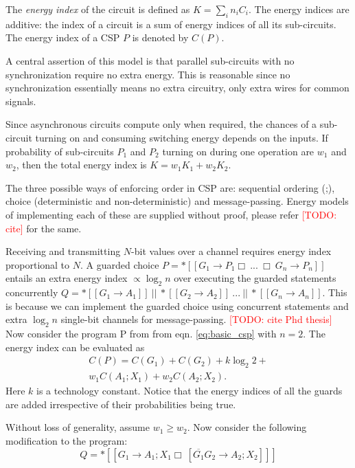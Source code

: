 The \emph{energy index} of the circuit is defined as $K = \sum_i n_i C_i$.
The energy indices are additive: the index of a circuit is a sum of energy indices
of all its sub-circuits. The energy index of a CSP $P$ is denoted by $C(P)$.

A central assertion of this model is that parallel sub-circuits with no
synchronization require no extra energy. 
This is reasonable since no synchronization essentially means no
extra circuitry, only extra wires for common signals. 

Since asynchronous circuits compute only when required, the chances of a sub-circuit 
turning on and consuming switching energy depends on the inputs. If probability
of sub-circuits $P_1$ and $P_2$ turning on during one operation are $w_1$
and $w_2$, then the total energy index is $K = w_1 K_1 + w_2 K_2$.

The three possible ways of enforcing order in CSP are: sequential ordering
(;), choice (deterministic and non-deterministic) and message-passing. Energy 
models of implementing each of these are supplied without proof, please refer 
\textcolor{red}{[TODO: cite]} for the same.

Receiving and transmitting $N$-bit values over a channel requires energy
index proportional to $N$. 
A guarded choice $P = *[[G_1 \to P_1 \Box\ ...\ \Box\ G_n \to P_n]]$
entails an extra energy index $\propto \log_2 {n}$ over executing the guarded 
statements concurrently 
$Q = *[[G_1 \to A_1 ]]\ ||\ *[[G_2 \to A_2]]\ ...\ ||\ *[[ G_n \to A_n]]$.
This is because we can implement the guarded choice using concurrent
statements and extra $\log_2{n}$ single-bit channels for message-passing.
\textcolor{red}{[TODO: cite Phd thesis]}
\\

Now consider the program P from from eqn. \ref{eq:basic_csp} with $n = 2$. The energy index
can be evaluated as 
\begin{equation}
\begin{split}
	C(P) = C(G_1) + C(G_2) + k \log_2{2} +\\
	w_1 C(A_1; X_1) + w_2 C(A_2; X_2).
\end{split}
\end{equation}
Here $k$ is a technology constant. Notice that the energy indices of all the
guards are added irrespective of their probabilities being true.

Without loss of generality, assume $w_1 \ge w_2$. 
Now consider the following modification to the program:
\begin{equation}
	Q = *[[ G_1 \to A_1; X_1 \Box\ [ \overline{G_1} G_2 \to A_2; X_2] ]]
\end{equation}

